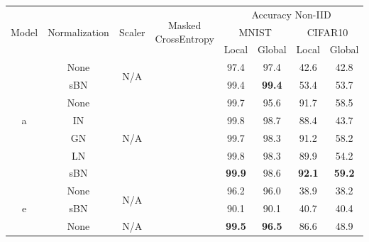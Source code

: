 \documentclass{article} %
\newcommand{\cmark}{\ding{51}}%
\newcommand{\xmark}{\ding{55}}%
\begin{document}
\begin{table}[hbtp]
\centering
\begin{tabular}{@{}cccccccc@{}}
\toprule
\multirow{3}{*}{Model} & \multirow{3}{*}{Normalization} & \multirow{3}{*}{Scaler} & \multirow{3}{*}{Masked CrossEntropy} & \multicolumn{4}{c}{Accuracy Non-IID} \\ \cmidrule(l){5-8} 
                      &      &                      &                    & \multicolumn{2}{c}{MNIST}     & \multicolumn{2}{c}{CIFAR10}   \\ \cmidrule(l){5-8} 
                      &      &                      &                    & Local         & Global        & Local         & Global        \\ \midrule
\multirow{7}{*}{a}    & None & \multirow{2}{*}{N/A} & \multirow{2}{*}{\xmark} & 97.4          & 97.4          & 42.6          & 42.8          \\
                      & sBN  &                      &                    & 99.4          & \textbf{99.4} & 53.4          & 53.7          \\ \cmidrule(l){2-8} 
                      & None & \multirow{5}{*}{N/A} & \multirow{5}{*}{\cmark} & 99.7          & 95.6          & 91.7          & 58.5          \\
                      & IN   &                      &                    & 99.8          & 98.7          & 88.4          & 43.7          \\
                      & GN   &                      &                    & 99.7          & 98.3          & 91.2          & 58.2          \\
                      & LN   &                      &                    & 99.8          & 98.3          & 89.9          & 54.2          \\
                      & sBN  &                      &                    & \textbf{99.9} & 98.6          & \textbf{92.1} & \textbf{59.2} \\ \midrule
\multirow{7}{*}{e}    & None & \multirow{2}{*}{N/A} & \multirow{2}{*}{\xmark} & 96.2          & 96.0          & 38.9          & 38.2          \\
                      & sBN  &                      &                    & 90.1          & 90.1          & 40.7          & 40.4          \\ \cmidrule(l){2-8} 
                      & None & \multirow{5}{*}{N/A} & \multirow{5}{*}{\cmark} & \textbf{99.5} & \textbf{96.5} & 86.6          & 48.9          \\

\end{tabular}
\end{table}
\end{document}
